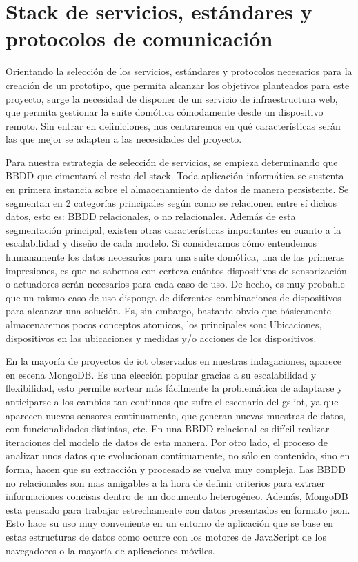 \section{Stack de servicios, estándares y protocolos de comunicación}
\label{ch:Capitulo2.3}



Orientando la selección de los servicios, estándares y protocolos necesarios para la creación de un prototipo, que permita alcanzar los objetivos planteados para este proyecto, surge la necesidad de disponer de un servicio de infraestructura web, que permita gestionar la suite domótica cómodamente desde un dispositivo remoto. Sin entrar en definiciones, nos centraremos en qué características serán las que mejor se adapten a las necesidades del proyecto.

\vspace{1cm}

Para nuestra estrategia de selección de servicios, se empieza determinando que BBDD que cimentará el resto del stack. Toda aplicación informática se sustenta en primera instancia sobre el almacenamiento de datos de manera persistente. Se segmentan en 2 categorías principales según como se relacionen entre sí dichos datos, esto es: BBDD relacionales, o no relacionales. Además de esta segmentación principal, existen otras características importantes en cuanto a la escalabilidad y diseño de cada modelo. Si consideramos cómo entendemos humanamente los datos necesarios para una suite domótica, una de las primeras impresiones, es que no sabemos con certeza cuántos dispositivos de sensorización o actuadores serán necesarios para cada caso de uso. De hecho, es muy probable que un mismo caso de uso disponga de diferentes combinaciones de dispositivos para alcanzar una solución. Es, sin embargo, bastante obvio que básicamente almacenaremos pocos conceptos atomicos, los principales son: Ubicaciones, dispositivos en las ubicaciones y medidas y/o acciones de los dispositivos.

\vspace{1cm}

En la mayoría de proyectos de \gls{iot} observados en nuestras indagaciones, aparece en escena MongoDB. Es una elección popular gracias a su escalabilidad y flexibilidad, esto permite sortear más fácilmente la problemática de adaptarse y anticiparse a los cambios tan continuos que sufre el escenario del gsl{iot}, ya que aparecen nuevos sensores continuamente, que generan nuevas muestras de datos, con funcionalidades distintas, etc. En una BBDD relacional es difícil realizar iteraciones del modelo de datos de esta manera. Por otro lado, el proceso de analizar unos datos que evolucionan continuamente, no sólo en contenido, sino en forma, hacen que su extracción y procesado se vuelva muy compleja. Las BBDD no relacionales son mas amigables a la hora de definir criterios para extraer informaciones concisas dentro de un documento heterogéneo. Además, MongoDB esta pensado para trabajar estrechamente con datos presentados en formato \gls{json}. Esto hace su uso muy conveniente en un entorno de aplicación que se base en estas estructuras de datos como ocurre con los motores de JavaScript de los navegadores o la mayoría de aplicaciones móviles.

